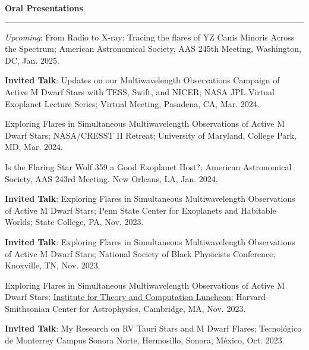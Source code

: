 \documentclass[letter,12pt]{article}
\begin{document}
\noindent
{\bf Oral Presentations} \\
\vspace{-10mm}
\begin{center}
\rule{\textwidth}{0.2mm}
\end{center}
\vspace{-3mm}
\noindent
\begin{etaremune}
\renewcommand\labelenumi{\bfseries\theenumi .}
\item \textit{Upcoming}: From Radio to X-ray: Tracing the flares of YZ Canis Minoris Across the Spectrum; American Astronomical Society, AAS 245th Meeting, Washington, DC, Jan. 2025.

\item \textbf{Invited Talk}: Updates on our Multiwavelength Observations Campaign of Active M Dwarf Stars with TESS, Swift, and NICER; NASA JPL Virtual Exoplanet Lecture Series; Virtual Meeting, Pasadena, CA, Mar. 2024. 

\item Exploring Flares in Simultaneous Multiwavelength Observations of Active M Dwarf Stars; NASA/CRESST II Retreat; University of Maryland, College Park, MD, Mar. 2024. 

\item Is the Flaring Star Wolf 359 a Good Exoplanet Host?; American Astronomical Society, AAS 243rd Meeting. New Orleans, LA, Jan. 2024.

\item \textbf{Invited Talk}: Exploring Flares in Simultaneous Multiwavelength Observations of Active M Dwarf Stars; Penn State Center for Exoplanets and Habitable Worlds; State College, PA, Nov. 2023.

\item \textbf{Invited Talk}: Exploring Flares in Simultaneous Multiwavelength Observations of Active M Dwarf Stars; National Society of Black Physicists Conference; Knoxville, TN, Nov. 2023.

\item Exploring Flares in Simultaneous Multiwavelength Observations of Active M Dwarf Stars; \href{https://itc.cfa.harvard.edu/event/itc-luncheon-112}{Institute for Theory and Computation Luncheon}; Harvard--Smithsonian Center for Astrophysics, Cambridge, MA, Nov. 2023.

\item \textbf{Invited Talk}: My Research on RV Tauri Stars and M Dwarf Flares; Tecnol\'{o}gico de Monterrey Campus Sonora Norte, Hermosillo, Sonora, M\'{e}xico, Oct. 2023.


\end{etaremune}
\end{document}
